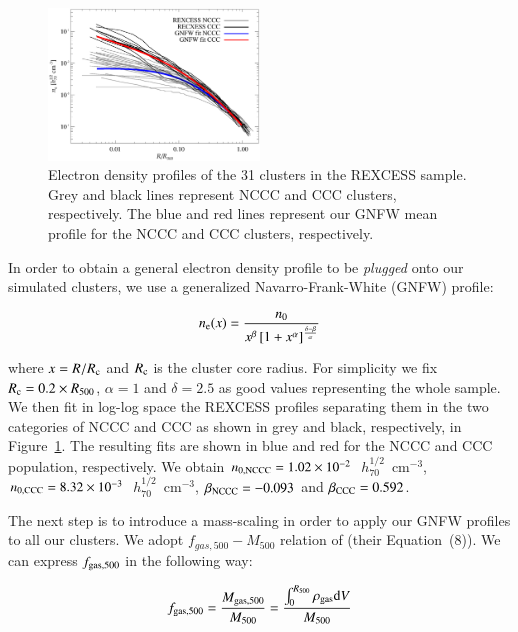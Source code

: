 \documentclass[traditabstract]{aa}
\newcommand{\rmn}{\mathrm}
\begin{document}
\begin{figure}[hbt!]
\centering
\includegraphics[width=0.5\textwidth]{figures/gas_profiles.eps}
\caption{Electron density profiles of the 31 clusters in the REXCESS sample. Grey and black lines represent NCCC and CCC clusters, respectively. The blue and red lines represent our GNFW mean profile for the NCCC and CCC clusters, respectively.}
\label{fig:gas_profiles}
\end{figure}

In order to obtain a general electron density profile to be \emph{plugged} onto our simulated clusters, we use a generalized Navarro-Frank-White (GNFW) profile:

\begin{equation}
n_{\rm{e}}(x) = \frac{n_{0}}{x^{\beta}\left[1+x^{\alpha}\right]^{\frac{\delta-\beta}{\alpha}}}
\label{eq:gnfw}
\end{equation}

where $x=R/R_{\rm{c}}$ and $R_{\rm{c}}$ is the cluster core radius. For simplicity we fix $R_{\rm{c}} = 0.2 \times R_{500}$, $\alpha = 1$ and $\delta = 2.5$ as good values representing the whole sample. We then fit in log-log space the REXCESS profiles separating them in the two categories of NCCC and CCC as shown in grey and black, respectively, in Figure~\ref{fig:gas_profiles}. The resulting fits are shown in blue and red for the NCCC and CCC population, respectively. We obtain $n_{\rm{0,NCCC}} = 1.02\times10^{-2}$~$h_{70}^{1/2}$~cm$^{-3}$, $n_{\rm{0,CCC}} = 8.32\times10^{-3}$~$h_{70}^{1/2}$~cm$^{-3}$, $\beta_{\rm{NCCC}} = -0.093$ and $\beta_{\rm{CCC}} = 0.592$.

The next step is to introduce a mass-scaling in order to apply our GNFW profiles to all our clusters. We adopt $f_{gas,500}-M_{500}$ relation of \cite{2009ApJ...693.1142S} (their Equation~(8)). We can express $f_{\rm{gas},500}$ in the following way:

\begin{equation}
f_{\rm{gas},500} = \frac{M_{\rm{gas},500}}{M_{500}}  = \frac{\int_{0}^{R_{500}} \rho_{\rm{gas}} \rmn{d}V}{M_{500}}
\label{eq:m500}
\end{equation}
\end{document}
